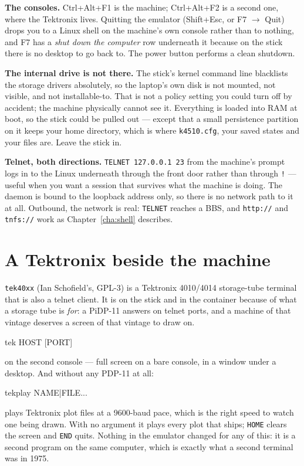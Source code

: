 \textbf{The consoles.} Ctrl+Alt+F1 is the machine; Ctrl+Alt+F2 is a
second one, where the Tektronix lives. Quitting the emulator (Shift+Esc,
or F7 $\rightarrow$ Quit) drops you to a Linux shell on the machine's own
console rather than to nothing, and F7 has a \emph{shut down the
computer} row underneath it because on the stick there is no desktop to
go back to. The power button performs a clean shutdown.

\textbf{The internal drive is not there.} The stick's kernel command line
blacklists the storage drivers absolutely, so the laptop's own disk is
not mounted, not visible, and not installable-to. That is not a policy
setting you could turn off by accident; the machine physically cannot see
it. Everything is loaded into RAM at boot, so the stick could be pulled
out --- except that a small persistence partition on it keeps your home
directory, which is where \texttt{k4510.cfg}, your saved states and your
files are. Leave the stick in.

\textbf{Telnet, both directions.} \verb|TELNET 127.0.0.1 23| from the
machine's prompt logs in to the Linux underneath through the front door
rather than through \verb|!| --- useful when you want a session that
survives what the machine is doing. The daemon is bound to the loopback
address only, so there is no network path to it at all. Outbound, the
network is real: \verb|TELNET| reaches a BBS, and \texttt{http://} and
\texttt{tnfs://} work as Chapter~\ref{cha:shell} describes.

\section{A Tektronix beside the machine}
\texttt{tek40xx} (Ian Schofield's, GPL-3) is a Tektronix 4010/4014
storage-tube terminal that is also a telnet client. It is on the stick and
in the container because of what a storage tube is \emph{for}: a PiDP-11
answers on telnet ports, and a machine of that vintage deserves a screen
of that vintage to draw on.

\begin{type}
tek HOST [PORT]
\end{type}

\noindent on the second console --- full screen on a bare console, in a
window under a desktop. And without any PDP-11 at all:

\begin{type}
tekplay NAME|FILE...
\end{type}

\noindent plays Tektronix plot files at a 9600-baud pace, which is the
right speed to watch one being drawn. With no argument it plays every
plot that ships; \texttt{HOME} clears the screen and \texttt{END} quits.
Nothing in the emulator changed for any of this: it is a second program
on the same computer, which is exactly what a second terminal was in
1975.
